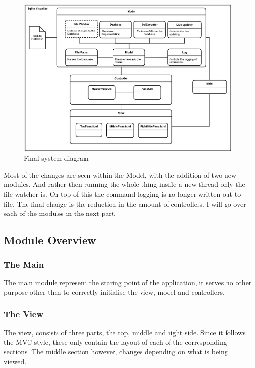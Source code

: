 \begin{figure}[H]
	\centering
	\includegraphics[scale=0.2]{images/system_diagram_new.png}
	\caption{Final system diagram}
	\label{fig:design_new}
\end{figure}

Most of the changes are seen within the Model, with the addition of two new modules. And rather then running the whole thing inside a new thread only the file watcher is. On top of this the command logging is no longer written out to file. The final change is the reduction in the amount of controllers. I will go over each of the modules in the next part.

\subsection{Module Overview}
\label{subsec:module_overview}

\subsubsection{The Main}
\label{subsubsec:main}

The main module represent the staring point of the application, it serves no other purpose other then to correctly initialise the view, model and controllers.

\subsubsection{The View}
\label{subsubsec:the_view}

The view, consists of three parts, the top, middle and right side. Since it follows the MVC style, these only contain the layout of each of the corresponding sections. The middle section however, changes depending on what is being viewed.

